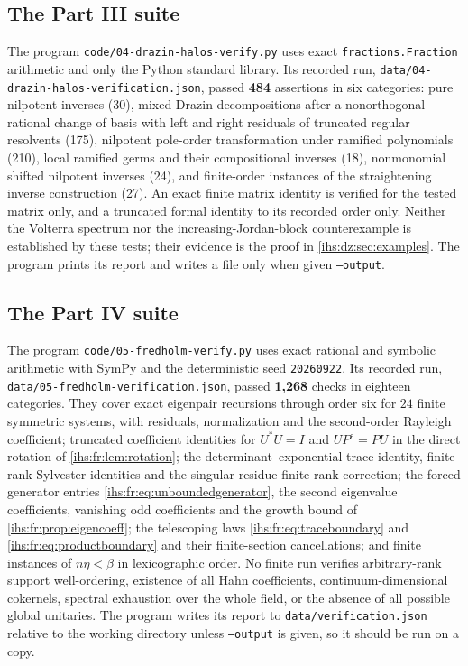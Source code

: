 \documentclass[11pt,a4paper]{article}
\numberwithin{equation}{section}
\theoremstyle{definition}
\theoremstyle{remark}
\begin{document}
\subsection{The Part III suite}\label{ihs:sec:checksthree}
The program \texttt{code/04-drazin-halos-verify.py} uses exact
\texttt{fractions.Fraction} arithmetic and only the Python standard library.
Its recorded run, \nolinkurl{data/04-drazin-halos-verification.json}, passed
\textbf{484} assertions in six categories: pure nilpotent inverses (30),
mixed Drazin decompositions after a nonorthogonal rational change of basis
with left and right residuals of truncated regular resolvents (175),
nilpotent pole-order transformation under ramified polynomials (210), local
ramified germs and their compositional inverses (18), nonmonomial shifted
nilpotent inverses (24), and finite-order instances of the straightening
inverse construction (27). An exact finite matrix identity is verified for
the tested matrix only, and a truncated formal identity to its recorded
order only. Neither the Volterra spectrum nor the increasing-Jordan-block
counterexample is established by these tests; their evidence is the proof in
\cref{ihs:dz:sec:examples}. The program prints its report and writes a file
only when given \texttt{--output}.

\subsection{The Part IV suite}\label{ihs:sec:checksfour}
The program \texttt{code/05-fredholm-verify.py} uses exact rational and
symbolic arithmetic with SymPy and the deterministic seed \texttt{20260922}.
Its recorded run, \nolinkurl{data/05-fredholm-verification.json}, passed
\textbf{1,268} checks in eighteen categories. They cover exact eigenpair
recursions through order six for $24$ finite symmetric systems, with
residuals, normalization and the second-order Rayleigh coefficient; truncated
coefficient identities for $U^*U=I$ and $UP^\circ=PU$ in the direct rotation
of \cref{ihs:fr:lem:rotation}; the determinant--exponential-trace identity,
finite-rank Sylvester identities and the singular-residue finite-rank
correction; the forced generator entries
\eqref{ihs:fr:eq:unboundedgenerator}, the second eigenvalue coefficients,
vanishing odd coefficients and the growth bound of
\cref{ihs:fr:prop:eigencoeff}; the telescoping laws
\eqref{ihs:fr:eq:traceboundary} and \eqref{ihs:fr:eq:productboundary} and
their finite-section cancellations; and finite instances of $n\eta<\beta$ in
lexicographic order. No finite run verifies arbitrary-rank support
well-ordering, existence of all Hahn coefficients, continuum-dimensional
cokernels, spectral exhaustion over the whole field, or the absence of all
possible global unitaries. The program writes its report to
\texttt{data/verification.json} relative to the working directory unless
\texttt{--output} is given, so it should be run on a copy.
\end{document}
